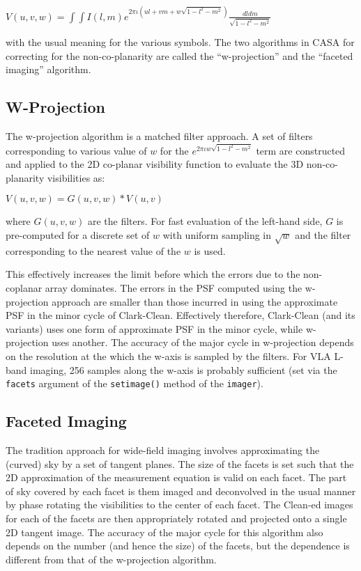 $ V(u,v,w)=\int\int I(l,m) e^{2\pi\iota(u l + v m + w \sqrt{1-l^2-m^2})}
\frac{dl dm}{\sqrt{1-l^2-m^2}} $

with the usual meaning for the various symbols.  The two algorithms
in CASA for correcting for the non-co-planarity are called the
``w-projection'' and the ``faceted imaging'' algorithm.

\subsection{W-Projection}
\label{section:imtool.widefield.wproj}

The w-projection algorithm is a matched filter approach.  A set of
filters corresponding to various value of $w$ for the $e^{2\pi\iota w
\sqrt{1-l^2-m^2}}$ term are constructed and applied to the 2D
co-planar visibility function to evaluate the 3D non-co-planarity
visibilities as:

$ V(u,v,w)=G(u,v,w)*V(u,v) $

where $G(u,v,w)$ are the filters.  For fast evaluation of the
left-hand side, $G$ is pre-computed for a discrete set of $w$ with
uniform sampling in $\sqrt{w}$ and the filter corresponding to the
nearest value of the $w$ is used.

This effectively increases the limit before which the errors due to
the non-coplanar array dominates.  The errors in the PSF computed
using the w-projection approach are smaller than those incurred in
using the approximate PSF in the minor cycle of Clark-Clean.
Effectively therefore, Clark-Clean (and its variants) uses one form of
approximate PSF in the minor cycle, while w-projection uses another.
The accuracy of the major cycle in w-projection depends on the
resolution at the which the w-axis is sampled by the filters.  For VLA
L-band imaging, 256 samples along the w-axis is probably sufficient
(set via the {\tt facets} argument of the {\tt setimage()} method of
the {\tt imager}).

\subsection{Faceted Imaging}
\label{section:imtool.widefield.facet}

The tradition approach for wide-field imaging involves approximating
the (curved) sky by a set of tangent planes. The size of the facets is
set such that the 2D approximation of the measurement equation is
valid on each facet. The part of sky covered by each facet is them
imaged and deconvolved in the usual manner by phase rotating the
visibilities to the center of each facet.  The Clean-ed images for
each of the facets are then appropriately rotated and projected onto a
single 2D tangent image.  The accuracy of the major cycle for this
algorithm also depends on the number (and hence the size) of the
facets, but the dependence is different from that of the w-projection
algorithm.

